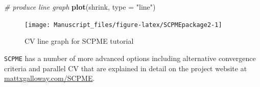 \documentclass[11pt,]{report}
\newenvironment{Shaded}{\begin{snugshade}}{\end{snugshade}}
\newcommand{\CommentTok}[1]{\textcolor[rgb]{0.56,0.35,0.01}{\textit{#1}}}
\newcommand{\DataTypeTok}[1]{\textcolor[rgb]{0.13,0.29,0.53}{#1}}
\newcommand{\KeywordTok}[1]{\textcolor[rgb]{0.13,0.29,0.53}{\textbf{#1}}}
\newcommand{\NormalTok}[1]{#1}
\newcommand{\StringTok}[1]{\textcolor[rgb]{0.31,0.60,0.02}{#1}}
\theoremstyle{definition}
\theoremstyle{definition}
\theoremstyle{definition}
\theoremstyle{remark}
\begin{document}
\begin{Shaded}
\begin{Highlighting}[]
\CommentTok{# produce line graph}
\KeywordTok{plot}\NormalTok{(shrink, }\DataTypeTok{type =} \StringTok{"line"}\NormalTok{)}
\end{Highlighting}
\end{Shaded}

\begin{figure}

{\centering \texttt{[image: Manuscript\_files/figure-latex/SCPMEpackage2-1]} 

}

\caption{CV line graph for SCPME tutorial}\label{fig:SCPMEpackage2}
\end{figure}

\vspace{0.5cm}

\texttt{SCPME} has a number of more advanced options including alternative convergence criteria and parallel CV that are explained in detail on the project website at \href{http://mattxgalloway.com/SCPME/}{mattxgalloway.com/SCPME}.


\end{document}

